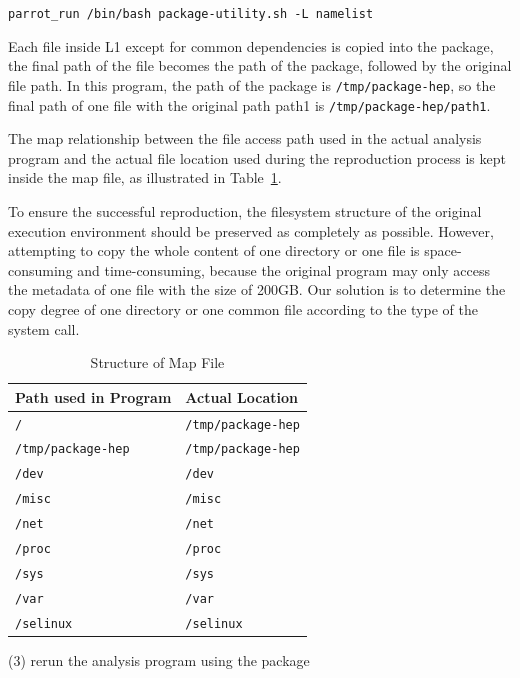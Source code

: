 \documentclass{acm_proc_article-sp}
\begin{document}
{\tt parrot\_run /bin/bash package-utility.sh -L namelist}

Each file inside L1 except for common dependencies is copied into the package, the final path of the file
becomes the path of the package, followed by the original file path. In this
program, the path of the package is {\tt /tmp/package-hep}, so the final path of one
file with the original path path1 is {\tt /tmp/package-hep/path1}.

The map relationship between the file access path used in the actual analysis
program and the actual file location used during the reproduction process is
kept inside the map file, as illustrated in Table~\ref{table:map-file}.

To ensure the successful reproduction, the filesystem structure of the original
execution environment should be preserved as completely as possible. However,
attempting to copy the whole content of one directory or one file is
space-consuming and time-consuming, because the original program may only
access the metadata of one file with the size of 200GB. Our solution is to
determine the copy degree of one directory or one common file according to the
type of the system call.


\begin{table}
    \centering
    \begin{tabular}{|l|l|}
    \hline
    Path used in Program & Actual Location \\ \hline
    {\tt /} & {\tt /tmp/package-hep} \\ \hline
    {\tt /tmp/package-hep} & {\tt /tmp/package-hep} \\ \hline
    {\tt /dev} & {\tt /dev} \\ \hline
    {\tt /misc} & {\tt /misc}\\ \hline
    {\tt /net} & {\tt /net}\\ \hline
    {\tt /proc} & {\tt /proc}\\ \hline
    {\tt /sys} & {\tt /sys}\\ \hline
    {\tt /var} & {\tt /var}\\ \hline
    {\tt /selinux} & {\tt /selinux}\\ \hline
    \end{tabular}
    \caption{Structure of Map File}
    \label{table:map-file}
\end{table}

(3) rerun the analysis program using the package
\end{document}
